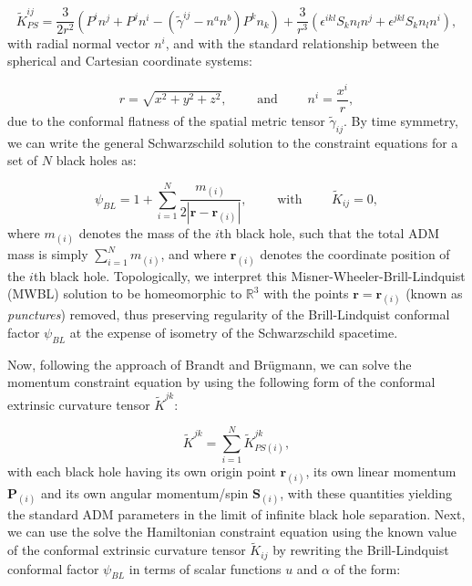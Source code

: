 \documentclass{article}
\begin{document}
\begin{equation}
\tilde{K}_{PS}^{i j} = \frac{3}{2 r^2} \left( P^i n^j + P^j n^i - \left( \tilde{\gamma}^{i j} - n^a n^b \right) P^k n_k \right) + \frac{3}{r^3} \left( \epsilon^{i k l} S_k n_l n^j + \epsilon^{j k l} S_k n_l n^i \right),
\end{equation}
with radial normal vector ${n^i}$, and with the standard relationship between the spherical and Cartesian coordinate systems:

\begin{equation}
r = \sqrt{x^2 + y^2 + z^2}, \qquad \text{ and } \qquad n^i = \frac{x^i}{r},
\end{equation}
due to the conformal flatness of the spatial metric tensor ${\tilde{\gamma}_{i j}}$. By time symmetry, we can write the general Schwarzschild solution to the constraint equations for a set of $N$ black holes as:

\begin{equation}
\psi_{BL} = 1 + \sum_{i = 1}^{N} \frac{m_{\left( i \right)}}{2 \left\lvert \mathbf{r} - \mathbf{r}_{\left( i \right)} \right\rvert}, \qquad \text{ with } \qquad \tilde{K}_{i j} = 0,
\end{equation}
where ${m_{\left( i \right)}}$ denotes the mass of the $i$th black hole, such that the total ADM mass is simply ${\sum\limits_{i = 1}^{N} m_{\left( i \right)}}$, and where ${\mathbf{r}_{\left( i \right)}}$ denotes the coordinate position of the $i$th black hole. Topologically, we interpret this Misner-Wheeler-Brill-Lindquist (MWBL) solution to be homeomorphic to ${\mathbb{R}^3}$ with the points ${\mathbf{r} = \mathbf{r}_{\left( i \right)}}$ (known as \textit{punctures}) removed, thus preserving regularity of the Brill-Lindquist conformal factor ${\psi_{BL}}$ at the expense of isometry of the Schwarzschild spacetime.

Now, following the approach of Brandt and Br\"ugmann\cite{brandt}, we can solve the momentum constraint equation by using the following form of the conformal extrinsic curvature tensor ${\tilde{K}^{j k}}$:

\begin{equation}
\tilde{K}^{j k} = \sum_{i = 1}^{N} \tilde{K}^{j k}_{PS \left( i \right)},
\end{equation}
with each black hole having its own origin point ${\mathbf{r}_{\left( i \right)}}$, its own linear momentum ${\mathbf{P}_{\left( i \right)}}$ and its own angular momentum/spin ${\mathbf{S}_{\left( i \right)}}$, with these quantities yielding the standard ADM parameters in the limit of infinite black hole separation. Next, we can use the solve the Hamiltonian constraint equation using the known value of the conformal extrinsic curvature tensor ${\tilde{K}_{i j}}$ by rewriting the Brill-Lindquist conformal factor ${\psi_{BL}}$ in terms of scalar functions $u$ and ${\alpha}$ of the form:
\end{document}
